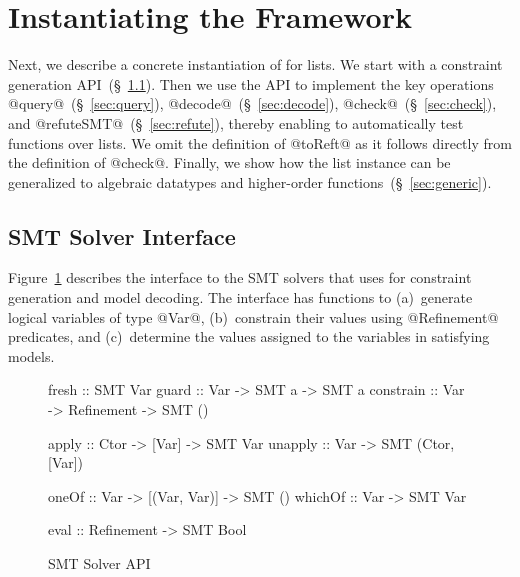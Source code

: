 \section{Instantiating the \toolname Framework}\label{sec:list}

Next, we describe a concrete instantiation of \toolname for lists.
%
We start with a constraint generation API~(\S~\ref{sec:constraint}). 
%
Then we use the API to implement the key operations 
\hbox{@query@~(\S~\ref{sec:query}),} 
\hbox{@decode@~(\S~\ref{sec:decode}),} 
\hbox{@check@~(\S~\ref{sec:check}),} and
\hbox{@refuteSMT@~(\S~\ref{sec:refute}),} 
thereby enabling \toolname to automatically test functions over lists.
We omit the definition of @toReft@ as it follows directly from the
definition of @check@.
%
Finally, we show how the list instance can be generalized to algebraic 
datatypes and higher-order functions~(\S~\ref{sec:generic}).

\subsection{SMT Solver Interface}\label{sec:constraint}

Figure~\ref{fig:smt} describes the interface to the SMT 
solvers that \toolname uses for constraint generation and 
model decoding. The interface has functions to 
%
(a)~generate logical variables of type @Var@, 
%
(b)~constrain their values using @Refinement@ predicates, and
%
(c)~determine the values assigned to the variables in satisfying models.

\begin{figure}[ht!]
\begin{mdframed}
\begin{CenteredBox}
\begin{code} 
fresh     :: SMT Var
guard     :: Var -> SMT a      -> SMT a 
constrain :: Var -> Refinement -> SMT ()

apply     :: Ctor -> [Var] -> SMT Var 
unapply   :: Var  -> SMT (Ctor, [Var])

oneOf     :: Var -> [(Var, Var)] -> SMT ()
whichOf   :: Var -> SMT Var

eval      :: Refinement -> SMT Bool
\end{code}
\end{CenteredBox}
\end{mdframed}
\caption{SMT Solver API}\label{fig:smt}
\end{figure}

